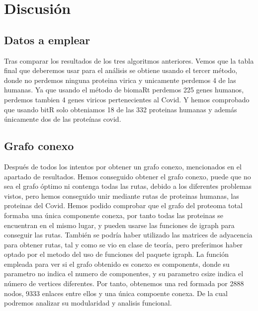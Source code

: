 \section{Discusión}
\begin{Document}

\subsection{Datos a emplear}
Tras comparar los resultados de los tres algoritmos anteriores. Vemos que la tabla final que deberemos usar para el análisis se obtiene usando el tercer método, donde no perdemos ninguna proteina virica y unicamente perdemos 4 de las humanas. 
Ya que usando el método de biomaRt perdemos 225 genes humanos, perdemos tambien 4 genes viricos pertenecientes al Covid. Y hemos comprobado que usando bitR solo obteniamos 18 de las 332 proteinas humanas y además únicamente dos de las proteínas covid. 

\subsection{Grafo conexo}
Después de todos los intentos por obtener un grafo conexo, mencionados en el apartado de resultados. Hemos conseguido obtener el grafo conexo, puede que no sea el grafo óptimo ni contenga todas las rutas, debido a los diferentes problemas vistos, pero hemos conseguido unir mediante rutas de proteinas humanas, las proteinas del Covid. 
Hemos podido comprobar que el grafo del proteoma total formaba una única componente conexa, por tanto todas las proteinas se encuentran en el mismo lugar, y pueden usarse las funciones de igraph para conseguir las rutas. 
También se podría haber utilizado las matrices de adyacencia para obtener rutas, tal y como se vio en clase de teoría, pero preferimos haber optado por el metodo del uso de funciones del paquete igraph. La función empleada para ver si el grafo obtenido es conexo es components, donde su parametro no indica el numero de componentes, y su parametro csize indica el número de vertices diferentes. 
Por tanto, obtenemos una red formada por 2888 nodos, 9333 enlaces entre ellos y una única compoente conexa. De la cual podremos analizar su modularidad y analisis funcional.
\end{Document}
